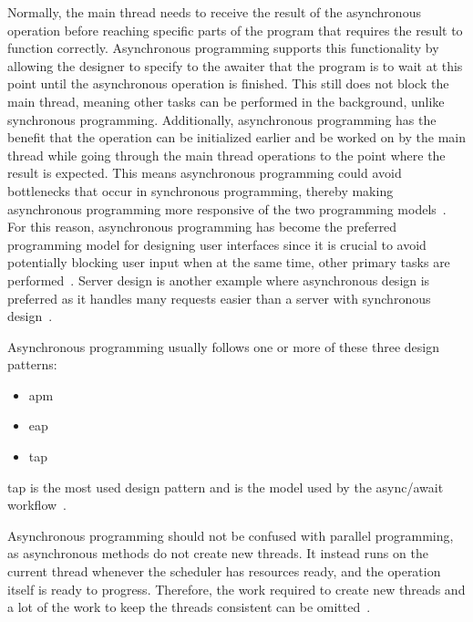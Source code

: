 Normally, the main thread needs to receive the result of the asynchronous operation before reaching specific parts of the program that requires the result to function correctly. Asynchronous programming supports this functionality by allowing the designer to specify to the awaiter that the program is to wait at this point until the asynchronous operation is finished. This still does not block the main thread, meaning other tasks can be performed in the background, unlike synchronous programming. Additionally, asynchronous programming has the benefit that the operation can be initialized earlier and be worked on by the main thread while going through the main thread operations to the point where the result is expected. This means asynchronous programming could avoid bottlenecks that occur in synchronous programming, thereby making asynchronous programming more responsive of the two programming models~\cite{DOC:TaskAsyncProgModel, WEB:AsyncAwaitTut}.
For this reason, asynchronous programming has become the preferred programming model for designing user interfaces since it is crucial to avoid potentially blocking user input when at the same time, other primary tasks are performed~\cites{VIDEO:AsyncConBack}[p.~214]{BOOK:DotnetMultithreadCookBook}. Server design is another example where asynchronous design is preferred as it handles many requests easier than a server with synchronous design~\cite{VIDEO:AsyncConBack, DOC:AsyncAwait}.

Asynchronous programming usually follows one or more of these three design patterns:
\begin{itemize}
	\item{\ac{apm}}
	\item{\ac{eap}}	
	\item{\ac{tap}}
\end{itemize}
\ac{tap} is the most used design pattern and is the model used by the async/await workflow~\cite{DOC:AsyncAwait, WEB:AsyncAwaitTut}.

Asynchronous programming should not be confused with parallel programming, as asynchronous methods do not create new threads. It instead runs on the current thread whenever the scheduler has resources ready, and the operation itself is ready to progress. Therefore, the work required to create new threads and a lot of the work to keep the threads consistent can be omitted~\cite{DOC:TaskAsyncProgModel}. 


